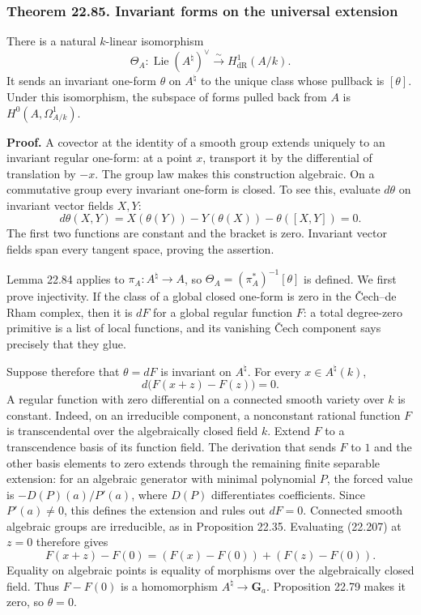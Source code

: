 \documentclass[
  11pt,
  a4paper,
]{article}
\begin{document}
\subsubsection{Theorem 22.85. Invariant forms on the universal
extension}\label{theorem-22.85.-invariant-forms-on-the-universal-extension}

There is a natural \(k\)-linear isomorphism \[
 \Theta_A:\operatorname{Lie}(A^\natural)^\vee
       \xrightarrow{\;\sim\;}H^1_{\mathrm{dR}}(A/k).
 \tag{22.206}
\] It sends an invariant one-form \(\theta\) on \(A^\natural\) to the
unique class whose pullback is \([\theta]\). Under this isomorphism, the
subspace of forms pulled back from \(A\) is \(H^0(A,\Omega^1_{A/k})\).

\textbf{Proof.} A covector at the identity of a smooth group extends
uniquely to an invariant regular one-form: at a point \(x\), transport
it by the differential of translation by \(-x\). The group law makes
this construction algebraic. On a commutative group every invariant
one-form is closed. To see this, evaluate \(d\theta\) on invariant
vector fields \(X,Y\): \[
 d\theta(X,Y)=X(\theta(Y))-Y(\theta(X))-\theta([X,Y])=0.
\] The first two functions are constant and the bracket is zero.
Invariant vector fields span every tangent space, proving the assertion.

Lemma 22.84 applies to \(\pi_A:A^\natural\to A\), so
\(\Theta_A=(\pi_A^*)^{-1}[\theta]\) is defined. We first prove
injectivity. If the class of a global closed one-form is zero in the
Čech--de Rham complex, then it is \(dF\) for a global regular function
\(F\): a total degree-zero primitive is a list of local functions, and
its vanishing Čech component says precisely that they glue.

Suppose therefore that \(\theta=dF\) is invariant on \(A^\natural\). For
every \(x\in A^\natural(k)\), \[
 d\bigl(F(x+z)-F(z)\bigr)=0.
 \tag{22.207}
\] A regular function with zero differential on a connected smooth
variety over \(k\) is constant. Indeed, on an irreducible component, a
nonconstant rational function \(F\) is transcendental over the
algebraically closed field \(k\). Extend \(F\) to a transcendence basis
of its function field. The derivation that sends \(F\) to \(1\) and the
other basis elements to zero extends through the remaining finite
separable extension: for an algebraic generator with minimal polynomial
\(P\), the forced value is \(-D(P)(a)/P'(a)\), where \(D(P)\)
differentiates coefficients. Since \(P'(a)\ne0\), this defines the
extension and rules out \(dF=0\). Connected smooth algebraic groups are
irreducible, as in Proposition 22.35. Evaluating (22.207) at \(z=0\)
therefore gives \[
 F(x+z)-F(0)=(F(x)-F(0))+(F(z)-F(0)).
\] Equality on algebraic points is equality of morphisms over the
algebraically closed field. Thus \(F-F(0)\) is a homomorphism
\(A^\natural\to\mathbf G_a\). Proposition 22.79 makes it zero, so
\(\theta=0\).
\end{document}
